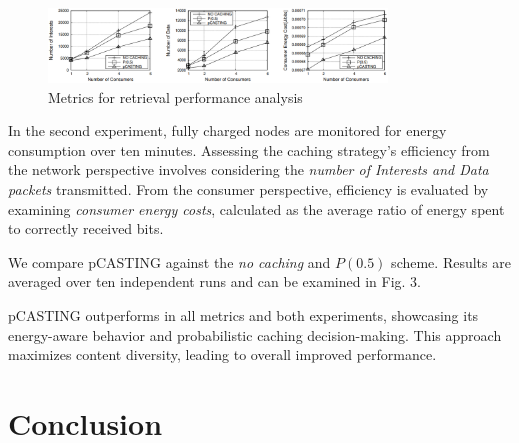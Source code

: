 \documentclass[conference]{IEEEtran}
\begin{document}
\begin{figure}[htbp]
    \centerline{\includegraphics[width=9cm]{fig3.png}}
    \caption{Metrics for retrieval performance analysis}
    \label{fig3}
\end{figure}

In the second experiment, fully charged nodes are monitored for energy consumption over ten minutes. Assessing the caching 
strategy's efficiency from the network perspective involves considering the \textit{number of Interests and Data packets} transmitted. 
From the consumer perspective, efficiency is evaluated by examining \textit{consumer energy costs}, calculated as the average ratio of 
energy spent to correctly received bits.

We compare pCASTING against the \textit{no caching} and $P(0.5)$ scheme. Results are averaged over ten independent runs
and can be examined in Fig. 3.



pCASTING outperforms in all metrics and both experiments, showcasing its energy-aware behavior and probabilistic 
caching decision-making. This approach maximizes content diversity, leading to overall improved performance.


\section{Conclusion}
\end{document}
